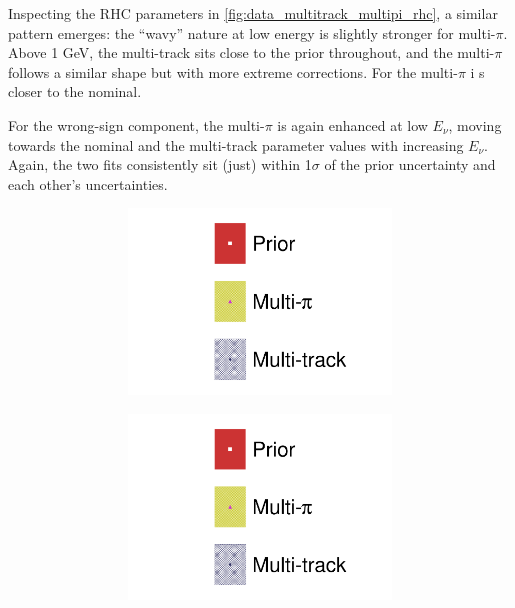 Inspecting the \numubar RHC parameters in \autoref{fig:data_multitrack_multipi_rhc}, a similar pattern emerges: the ``wavy'' nature at low energy is slightly stronger for multi-$\pi$. Above 1 GeV, the multi-track sits close to the prior throughout, and the multi-$\pi$ follows a similar shape but with more extreme corrections. For \nuebar the multi-$\pi$ i s closer to the nominal.

For the wrong-sign component, the multi-$\pi$ is again enhanced at low $E_\nu$, moving towards the nominal and the multi-track parameter values with increasing $E_\nu$. Again, the two fits consistently sit (just) within 1$\sigma$ of the prior uncertainty and each other's uncertainties.
\begin{figure}[h]
	\centering
		\begin{subfigure}[t]{\textwidth}
	\begin{subfigure}[t]{0.24\textwidth}
		\includegraphics[width=\textwidth,page=6, trim={0mm 0mm 0mm 9mm}, clip]{figures/mach3/2018/data/2018a_FixedCov_RedCov_Mpi_Data_merg_2018a_NewDetMatrix_OrderSwitched_Data2to8_ActualData_merge}
	\end{subfigure}
	\begin{subfigure}[t]{0.24\textwidth}
		\includegraphics[width=\textwidth,page=7, trim={0mm 0mm 0mm 9mm}, clip]{figures/mach3/2018/data/2018a_FixedCov_RedCov_Mpi_Data_merg_2018a_NewDetMatrix_OrderSwitched_Data2to8_ActualData_merge}

\end{subfigure}
\end{subfigure}
\end{figure}
